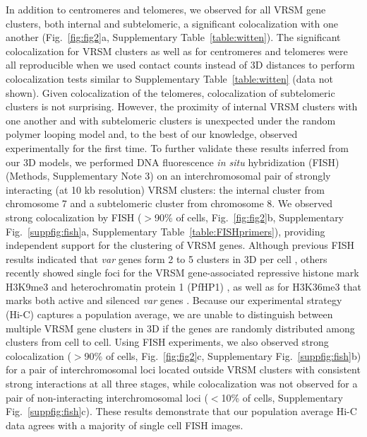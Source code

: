 In addition to centromeres and telomeres, we observed for all VRSM gene clusters, both internal and subtelomeric, a significant colocalization with one another (Fig.~\ref{fig:fig2}a, Supplementary Table~\ref*{table:witten}). The significant colocalization for VRSM clusters as well as for centromeres and telomeres were all reproducible when we used contact counts instead of 3D distances to perform colocalization tests similar to Supplementary Table~\ref*{table:witten} (data not shown). Given colocalization of the telomeres, colocalization of subtelomeric clusters is not surprising. However, the proximity of internal VRSM clusters with one another and with subtelomeric clusters is unexpected under the random polymer looping model and, to the best of our knowledge, observed experimentally for the first time. To further validate these results inferred from our 3D models, we performed DNA fluorescence {\em in situ} hybridization (FISH) (Methods, Supplementary Note 3) on an interchromosomal pair of strongly interacting (at 10 kb resolution) VRSM clusters: the internal cluster from chromosome 7 and a subtelomeric cluster from chromosome 8. We observed strong colocalization by FISH ($>$90\% of cells, Fig.~\ref{fig:fig2}b, Supplementary Fig.~\ref*{suppfig:fish}a, Supplementary Table~\ref*{table:FISHprimers}), providing independent support for the clustering of VRSM genes. Although previous FISH results indicated that {\em var} genes form 2 to 5 clusters in 3D per cell \citep{freitas-junior:frequent, lopez-rubio:genome-wide}, others recently showed single foci for the VRSM gene-associated repressive histone mark H3K9me3 and heterochromatin protein 1 (PfHP1) \citep{dahan:pfsec13}, as well as for H3K36me3 that marks both active and silenced {\em var} genes \citep{ukaegbu:recruitment}. Because our experimental strategy (Hi-C) captures a population average, we are unable to distinguish between multiple VRSM gene clusters in 3D if the genes are randomly distributed among clusters from cell to cell. Using FISH experiments, we also observed strong colocalization ($>$90\% of cells, Fig.~\ref{fig:fig2}c, Supplementary Fig.~\ref*{suppfig:fish}b) for a pair of interchromosomal loci located outside VRSM clusters with consistent strong interactions at all three stages, while colocalization was not observed for a pair of non-interacting interchromosomal loci ($<$10\% of cells, Supplementary Fig.~\ref*{suppfig:fish}c). These results demonstrate that our population average Hi-C data agrees with a majority of single cell FISH images.

